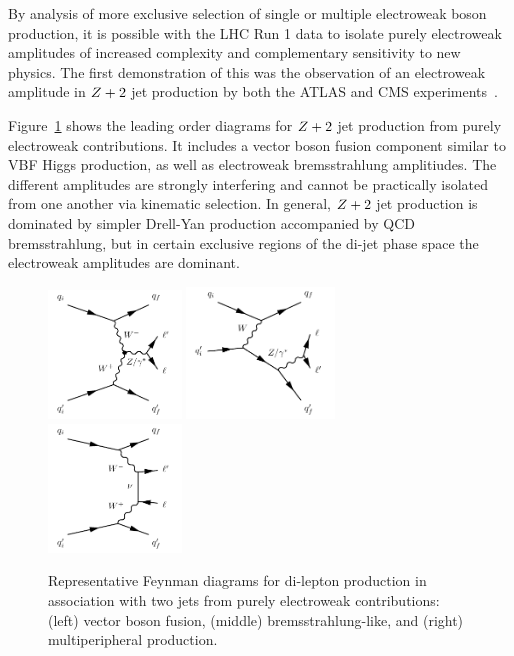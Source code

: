 By analysis of more exclusive selection of single or multiple electroweak boson production,
it is possible with the LHC Run 1 data to isolate purely electroweak amplitudes of
increased complexity and complementary sensitivity to new physics.  The first demonstration of
this was the observation of an electroweak amplitude in $Z+2$ jet production by both the
ATLAS and CMS experiments~\cite{Aad:2014dta, Khachatryan:2014dea}.

Figure~\ref{fig:ss-exclboson-z2j-sigdiagram} shows the leading order diagrams for $Z+2$ jet production
from purely electroweak contributions.  It includes a vector boson fusion component similar to
VBF Higgs production, as well as electroweak bremsstrahlung amplitiudes.  The different amplitudes
are strongly interfering and cannot be practically isolated from one another via kinematic selection.
In general, $Z+2$ jet production is dominated by simpler Drell-Yan production accompanied by QCD bremsstrahlung,
but in certain exclusive regions of the di-jet phase space the electroweak amplitudes are dominant.

\begin{figure}[htb] {
\centering
\includegraphics[width=0.315\textwidth]{figures/ss-exclboson-z2j-vbfz_diagram.pdf}
\includegraphics[width=0.35\textwidth]{figures/ss-exclboson-z2j-bckg3_diagram.pdf}
\includegraphics[width=0.315\textwidth]{figures/ss-exclboson-z2j-bckg1_diagram.pdf}
\caption{
Representative Feynman diagrams for di-lepton production in association
with two jets from purely electroweak contributions:
(left) vector boson fusion,
(middle) bremsstrahlung-like,
and (right) multiperipheral production.
\label{fig:ss-exclboson-z2j-sigdiagram}}

}
\end{figure}


